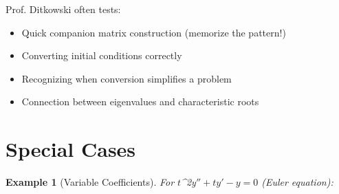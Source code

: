 \documentclass[12pt]{article}
\newtheorem{example}{Example}
\begin{document}

\begin{examtip}
Prof. Ditkowski often tests:
\begin{itemize}
\item Quick companion matrix construction (memorize the pattern!)
\item Converting initial conditions correctly
\item Recognizing when conversion simplifies a problem
\item Connection between eigenvalues and characteristic roots
\end{itemize}
\end{examtip}

\section{Special Cases}

\begin{example}[Variable Coefficients]
For $t$^{2y}$'' + ty' - y = 0$ (Euler equation):
\end{example}
\end{document}
